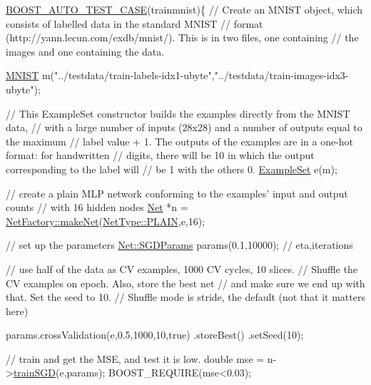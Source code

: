 \begin{DoxyCodeInclude}

\hyperlink{group__basictests_ga95e163533a64ba72e25fc8dfe7fbf065}{BOOST\_AUTO\_TEST\_CASE}(trainmnist)\{
    \textcolor{comment}{// Create an MNIST object, which consists of labelled data in the standard MNIST}
    \textcolor{comment}{// format (http://yann.lecun.com/exdb/mnist/). This is in two files, one containing}
    \textcolor{comment}{// the images and one containing the data.}
    
    \hyperlink{classMNIST}{MNIST} m(\textcolor{stringliteral}{"../testdata/train-labels-idx1-ubyte"},\textcolor{stringliteral}{"../testdata/train-images-idx3-ubyte"});
    
    \textcolor{comment}{// This ExampleSet constructor builds the examples directly from the MNIST data,}
    \textcolor{comment}{// with a large number of inputs (28x28) and a number of outputs equal to the maximum}
    \textcolor{comment}{// label value + 1. The outputs of the examples are in a one-hot format: for handwritten}
    \textcolor{comment}{// digits, there will be 10 in which the output corresponding to the label will}
    \textcolor{comment}{// be 1 with the others 0.}
    \hyperlink{classExampleSet}{ExampleSet} e(m);
    
    \textcolor{comment}{// create a plain MLP network conforming to the examples' input and output counts}
    \textcolor{comment}{// with 16 hidden nodes}
    \hyperlink{classNet}{Net} *n = \hyperlink{classNetFactory_abee207e81a04a7abf08e1f50bc2fe000}{NetFactory::makeNet}(\hyperlink{netType_8hpp_a1526df0fc932ccf720aa26267f923213af62eb0bf5e5c72e80983fbbac1cb70e5}{NetType::PLAIN},e,16);
    
    \textcolor{comment}{// set up the parameters}
    \hyperlink{structNet_1_1SGDParams}{Net::SGDParams} params(0.1,10000); \textcolor{comment}{// eta,iterations}
    
    \textcolor{comment}{// use half of the data as CV examples, 1000 CV cycles, 10 slices.}
    \textcolor{comment}{// Shuffle the CV examples on epoch. Also, store the best net}
    \textcolor{comment}{// and make sure we end up with that. Set the seed to 10.}
    \textcolor{comment}{// Shuffle mode is stride, the default (not that it matters here)}
    
    params.crossValidation(e,0.5,1000,10,\textcolor{keyword}{true})
          .storeBest()
          .setSeed(10);
    
    \textcolor{comment}{// train and get the MSE, and test it is low.}
    \textcolor{keywordtype}{double} mse = n->\hyperlink{classNet_a4e527a7773eed5fb071b78ef3a636c95}{trainSGD}(e,params);
    BOOST\_REQUIRE(mse<0.03);
    

\end{DoxyCodeInclude}
